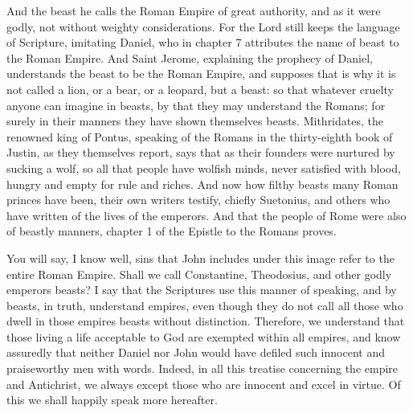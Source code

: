 And the beast he calls the Roman Empire of great authority, and as it were godly, not without weighty considerations. For the Lord still keeps the language of Scripture, imitating Daniel, who in chapter 7 attributes the name of beast to the Roman Empire. And Saint Jerome, explaining the prophecy of Daniel, understands the beast to be the Roman Empire, and supposes that is why it is not called a lion, or a bear, or a leopard, but a beast: so that whatever cruelty anyone can imagine in beasts, by that they may understand the Romans; for surely in their manners they have shown themselves beasts. Mithridates, the renowned king of Pontus, speaking of the Romans in the thirty-eighth book of Justin, as they themselves report, says that as their founders were nurtured by sucking a wolf, so all that people have wolfish minds, never satisfied with blood, hungry and empty for rule and riches. And now how filthy beasts many Roman princes have been, their own writers testify, chiefly Suetonius, and others who have written of the lives of the emperors. And that the people of Rome were also of beastly manners, chapter 1 of the Epistle to the Romans proves.

You will say, I know well, sins that John includes under this image refer to the entire Roman Empire. Shall we call Constantine, Theodosius, and other godly emperors beasts? I say that the Scriptures use this manner of speaking, and by beasts, in truth, understand empires, even though they do not call all those who dwell in those empires beasts without distinction. Therefore, we understand that those living a life acceptable to God are exempted within all empires, and know assuredly that neither Daniel nor John would have defiled such innocent and praiseworthy men with words. Indeed, in all this treatise concerning the empire and Antichrist, we always except those who are innocent and excel in virtue. Of this we shall happily speak more hereafter.

